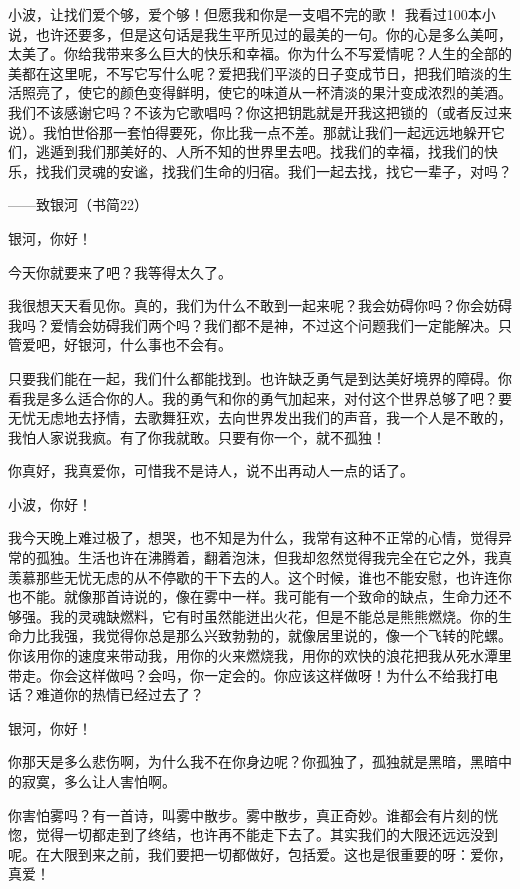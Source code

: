 小波，让找们爱个够，爱个够！但愿我和你是一支唱不完的歌！ 我看过100本小说，也许还要多，但是这句话是我生平所见过的最美的一句。你的心是多么美呵，太美了。你给我带来多么巨大的快乐和幸福。你为什么不写爱情呢？人生的全部的美都在这里呢，不写它写什么呢？爱把我们平淡的日子变成节日，把我们暗淡的生活照亮了，使它的颜色变得鲜明，使它的味道从一杯清淡的果汁变成浓烈的美酒。我们不该感谢它吗？不该为它歌唱吗？你这把钥匙就是开我这把锁的（或者反过来说）。我怕世俗那一套怕得要死，你比我一点不差。那就让我们一起远远地躲开它们，逃遁到我们那美好的、人所不知的世界里去吧。找我们的幸福，找我们的快乐，找我们灵魂的安谧，找我们生命的归宿。我们一起去找，找它一辈子，对吗？ 





——致银河（书简22） 

银河，你好！ 

今天你就要来了吧？我等得太久了。 

我很想天天看见你。真的，我们为什么不敢到一起来呢？我会妨碍你吗？你会妨碍我吗？爱情会妨碍我们两个吗？我们都不是神，不过这个问题我们一定能解决。只管爱吧，好银河，什么事也不会有。 

只要我们能在一起，我们什么都能找到。也许缺乏勇气是到达美好境界的障碍。你看我是多么适合你的人。我的勇气和你的勇气加起来，对付这个世界总够了吧？要无忧无虑地去抒情，去歌舞狂欢，去向世界发出我们的声音，我一个人是不敢的，我怕人家说我疯。有了你我就敢。只要有你一个，就不孤独！ 

你真好，我真爱你，可惜我不是诗人，说不出再动人一点的话了。 

小波，你好！ 

我今天晚上难过极了，想哭，也不知是为什么，我常有这种不正常的心情，觉得异常的孤独。生活也许在沸腾着，翻着泡沫，但我却忽然觉得我完全在它之外，我真羡慕那些无忧无虑的从不停歇的干下去的人。这个时候，谁也不能安慰，也许连你也不能。就像那首诗说的，像在雾中一样。我可能有一个致命的缺点，生命力还不够强。我的灵魂缺燃料，它有时虽然能迸出火花，但是不能总是熊熊燃烧。你的生命力比我强，我觉得你总是那么兴致勃勃的，就像居里说的，像一个飞转的陀螺。你该用你的速度来带动我，用你的火来燃烧我，用你的欢快的浪花把我从死水潭里带走。你会这样做吗？会吗，你一定会的。你应该这样做呀！为什么不给我打电话？难道你的热情已经过去了？ 

银河，你好！ 

你那天是多么悲伤啊，为什么我不在你身边呢？你孤独了，孤独就是黑暗，黑暗中的寂寞，多么让人害怕啊。 

你害怕雾吗？有一首诗，叫雾中散步。雾中散步，真正奇妙。谁都会有片刻的恍惚，觉得一切都走到了终结，也许再不能走下去了。其实我们的大限还远远没到呢。在大限到来之前，我们要把一切都做好，包括爱。这也是很重要的呀：爱你，真爱！ 

